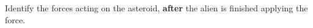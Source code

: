 \label{fnt7.2.1-5}

Identify the forces acting on the asteroid, \textbf{after} the alien is finished applying the force.